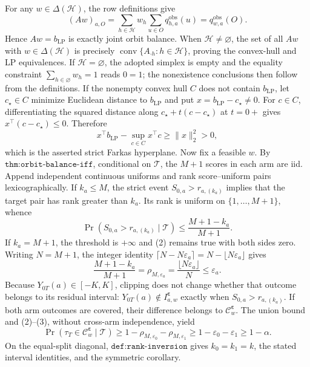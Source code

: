 For any \(w\in\Delta(\mathcal H)\), the row definitions give \[(Aw)_{a,O}=\sum_{h\in\mathcal H}w_h\sum_{u\in O}q^{\mathrm{obs}}_{h,a}(u)=q^{\mathrm{obs}}_{w,a}(O).\tag{1}\] Hence \(Aw=b_{\mathrm{LP}}\) is exactly joint orbit balance. When \(\mathcal H\ne\varnothing\), the set of all \(Aw\) with \(w\in\Delta(\mathcal H)\) is precisely \(\operatorname{conv}\{A_{\cdot h}:h\in\mathcal H\}\), proving the convex-hull and LP equivalences. If \(\mathcal H=\varnothing\), the adopted simplex is empty and the equality constraint \(\sum_{h\in\varnothing}w_h=1\) reads \(0=1\); the nonexistence conclusions then follow from the definitions. If the nonempty convex hull \(C\) does not contain \(b_{\mathrm{LP}}\), let \(c_\star\in C\) minimize Euclidean distance to \(b_{\mathrm{LP}}\) and put \(x=b_{\mathrm{LP}}-c_\star\ne0\). For \(c\in C\), differentiating the squared distance along \(c_\star+t(c-c_\star)\) at \(t=0+\) gives \(x^\top(c-c_\star)\le0\). Therefore \[x^\top b_{\mathrm{LP}}-\sup_{c\in C}x^\top c\ge\|x\|_2^2>0,\] which is the asserted strict Farkas hyperplane.
Now fix a feasible \(w\). By \(\texttt{thm:orbit-balance-iff}\), conditional on \(\mathcal T\), the \(M+1\) scores in each arm are iid. Append independent continuous uniforms and rank score--uniform pairs lexicographically. If \(k_a\le M\), the strict event \(S_{0,a}>r_{a,(k_a)}\) implies that the target pair has rank greater than \(k_a\). Its rank is uniform on \(\{1,\ldots,M+1\}\), whence \[\Pr(S_{0,a}>r_{a,(k_a)}\mid\mathcal T)\le\frac{M+1-k_a}{M+1}.\tag{2}\] If \(k_a=M+1\), the threshold is \(+\infty\) and (2) remains true with both sides zero. Writing \(N=M+1\), the integer identity \(\lceil N-N\varepsilon_a\rceil=N-\lfloor N\varepsilon_a\rfloor\) gives \[\frac{M+1-k_a}{M+1}=\rho_{M,\varepsilon_a}=\frac{\lfloor N\varepsilon_a\rfloor}{N}\le\varepsilon_a.\tag{3}\]
Because \(Y_{0T}(a)\in[-K,K]\), clipping does not change whether that outcome belongs to its residual interval: \(Y_{0T}(a)\notin I^{\boldsymbol\varepsilon}_{a,w}\) exactly when \(S_{0,a}>r_{a,(k_a)}\). If both arm outcomes are covered, their difference belongs to \(\mathcal C^{\boldsymbol\varepsilon}_w\). The union bound and (2)--(3), without cross-arm independence, yield \[\Pr(\tau_T\in\mathcal C^{\boldsymbol\varepsilon}_w\mid\mathcal T)\ge1-\rho_{M,\varepsilon_0}-\rho_{M,\varepsilon_1}\ge1-\varepsilon_0-\varepsilon_1\ge1-\alpha.\] On the equal-split diagonal, \(\texttt{def:rank-inversion}\) gives \(k_0=k_1=k\), the stated interval identities, and the symmetric corollary.